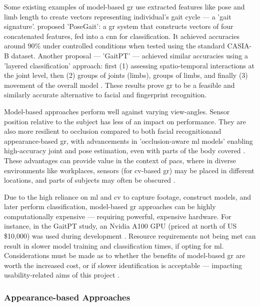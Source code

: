 Some existing examples of model-based \ac{gr} use extracted features like pose and limb length to create vectors representing individual's gait cycle --- a 'gait signature'.
\cite{liaoModelbasedGaitRecognition2020} proposed 'PoseGait':
a \ac{gr} system that constructs vectors of four concatenated features, fed into a \ac{cnn} for classification.
It achieved accuracies around 90\% under controlled conditions when tested using the standard CASIA-B dataset.
Another proposal --- 'GaitPT' --- achieved similar accuracies using a 'layered classification' approach: first (1) assessing spatio-temporal interactions at the joint level, then (2) groups of joints (limbs), groups of limbs, and finally (3) movement of the overall model \parencite{catrunaGaitPTSkeletonsAre2024}.
These results prove \ac{gr} to be a feasible and similarly accurate alternative to facial and fingerprint recognition.

Model-based approaches perform well against varying view-angles.
Sensor position relative to the subject has less of an impact on performance.
They are also more resilient to occlusion compared to both facial recognitionand appearance-based \ac{gr}, with advancements in 'occlusion-aware \ac{ml} models' enabling high-accuracy joint and pose estimation, even with parts of the body covered \parencite{xuComprehensiveFrameworkOccluded2024}.
These advantages can provide value in the context of \ac{pacs}, where in diverse environments like workplaces, sensors (for \ac{cv}-based \ac{gr}) may be placed in different locations, and parts of subjects may often be obscured \parencite{parasharAdvancementsArtificialIntelligence2024}.

Due to the high reliance on \ac{ml} and \ac{cv} to capture footage, construct models, and later perform classification, model-based \ac{gr} approaches can be highly computationally expensive --- requiring powerful, expensive hardware.
For instance, in the GaitPT study, an Nvidia A100 GPU (priced at north of US \$10,000) was used during development \parencite{catrunaGaitPTSkeletonsAre2024}.
Resource requirements not being met can result in slower model training and classification times, if opting for \ac{ml}.
Considerations must be made as to whether the benefits of model-based \ac{gr} are worth the increased cost, or if slower identification is acceptable --- impacting usability-related aims of this project \parencite{parasharAdvancementsArtificialIntelligence2024}.

\subsubsection{Appearance-based Approaches}
\label{subsubsec:appearance-based-approaches}

